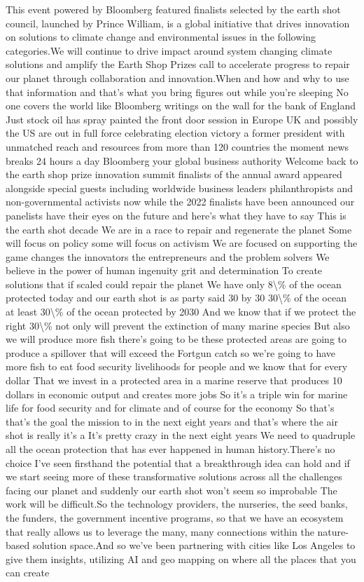 \documentclass{article}%
\begin{document}
This event powered by Bloomberg featured finalists selected by the earth shot council, launched by Prince William, is a global initiative that drives innovation on solutions to climate change and environmental issues in the following categories.We will continue to drive impact around system changing climate solutions and amplify the Earth Shop Prizes call to accelerate progress to repair our planet through collaboration and innovation.When and how and why to use that information and that's what you bring figures out while you're sleeping No one covers the world like Bloomberg writings on the wall for the bank of England Just stock oil has spray painted the front door session in Europe UK and possibly the US are out in full force celebrating election victory a former president with unmatched reach and resources from more than 120 countries the moment news breaks 24 hours a day Bloomberg your global business authority Welcome back to the earth shop prize innovation summit finalists of the annual award appeared alongside special guests including worldwide business leaders philanthropists and non{-}governmental activists now while the 2022 finalists have been announced our panelists have their eyes on the future and here's what they have to say This is the earth shot decade We are in a race to repair and regenerate the planet Some will focus on policy some will focus on activism We are focused on supporting the game changes the innovators the entrepreneurs and the problem solvers We believe in the power of human ingenuity grit and determination To create solutions that if scaled could repair the planet We have only 8\textbackslash{}\% of the ocean protected today and our earth shot is as party said 30 by 30 30\textbackslash{}\% of the ocean at least 30\textbackslash{}\% of the ocean protected by 2030 And we know that if we protect the right 30\textbackslash{}\% not only will prevent the extinction of many marine species But also we will produce more fish there's going to be these protected areas are going to produce a spillover that will exceed the Fortgun catch so we're going to have more fish to eat food security livelihoods for people and we know that for every dollar That we invest in a protected area in a marine reserve that produces 10 dollars in economic output and creates more jobs So it's a triple win for marine life for food security and for climate and of course for the economy So that's that's the goal the mission to in the next eight years and that's where the air shot is really it's a It's pretty crazy in the next eight years We need to quadruple all the ocean protection that has ever happened in human history.There's no choice I've seen firsthand the potential that a breakthrough idea can hold and if we start seeing more of these transformative solutions across all the challenges facing our planet and suddenly our earth shot won't seem so improbable The work will be difficult.So the technology providers, the nurseries, the seed banks, the funders, the government incentive programs, so that we have an ecosystem that really allows us to leverage the many, many connections within the nature{-}based solution space.And so we've been partnering with cities like Los Angeles to give them insights, utilizing AI and geo mapping on where all the places that you can create 
\end{document}

